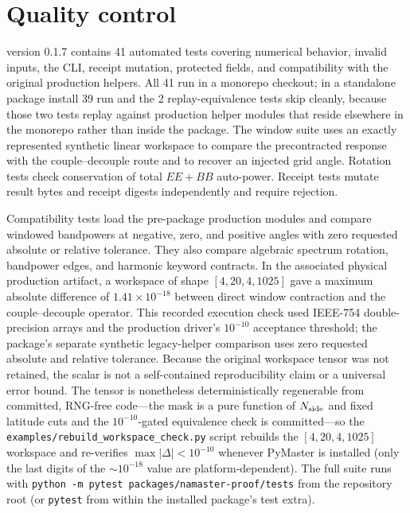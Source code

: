 \section*{Quality control}

\software{} version 0.1.7 contains 41 automated tests covering numerical behavior, invalid
inputs, the CLI, receipt mutation, protected fields, and compatibility with
the original production helpers.  All 41 run in a monorepo checkout; in a
standalone package install 39 run and the 2 replay-equivalence tests skip
cleanly, because those two tests replay against production helper modules that
reside elsewhere in the monorepo rather than inside the package.  The window suite uses an exactly represented
synthetic linear workspace to compare the precontracted response with the
couple--decouple route and to recover an injected grid angle.  Rotation tests
check conservation of total \(EE+BB\) auto-power.  Receipt tests mutate result
bytes and receipt digests independently and require rejection.

Compatibility tests load the pre-package production modules and compare
windowed bandpowers at negative, zero, and positive angles with zero requested
absolute or relative tolerance.  They also compare algebraic spectrum rotation,
bandpower edges, and harmonic keyword contracts.  In the associated physical
production artifact, a workspace of shape
\([4,20,4,1025]\) gave a maximum absolute difference of
\(1.41\times10^{-18}\) between direct window contraction and the
couple--decouple operator. This recorded execution check used IEEE-754
double-precision arrays and the production driver's \(10^{-10}\) acceptance
threshold; the package's separate synthetic legacy-helper comparison uses
zero requested absolute and relative tolerance. Because
the original workspace tensor was not retained, the scalar is not a
self-contained reproducibility claim or a universal error bound.
The tensor is nonetheless deterministically regenerable from committed,
RNG-free code---the mask is a pure function of \(N_{\rm side}\) and fixed
latitude cuts and the \(10^{-10}\)-gated equivalence check is committed---so
the \nolinkurl{examples/rebuild_workspace_check.py} script rebuilds the
\([4,20,4,1025]\) workspace and re-verifies \(\max|\Delta|<10^{-10}\) whenever
PyMaster is installed (only the last digits of the \(\sim10^{-18}\) value are
platform-dependent). The full suite runs with
\texttt{python -m pytest packages/namaster-proof/tests} from the repository
root (or \texttt{pytest} from within the installed package's test extra).

